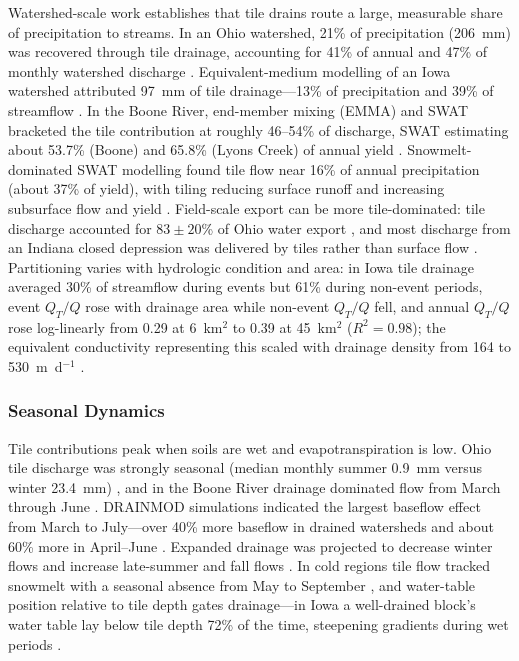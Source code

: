Watershed-scale work establishes that tile drains route a large, measurable share of precipitation to streams. In an Ohio watershed, 21\% of precipitation (206~mm) was recovered through tile drainage, accounting for 41\% of annual and 47\% of monthly watershed discharge \parencite{King2014}. Equivalent-medium modelling of an Iowa watershed attributed 97~mm of tile drainage---13\% of precipitation and 39\% of streamflow \parencite{Thomas2016}. In the Boone River, end-member mixing (EMMA) and SWAT bracketed the tile contribution at roughly 46--54\% of discharge, SWAT estimating about 53.7\% (Boone) and 65.8\% (Lyons Creek) of annual yield \parencite{Schilling2019}. Snowmelt-dominated SWAT modelling found tile flow near 16\% of annual precipitation (about 37\% of yield), with tiling reducing surface runoff and increasing subsurface flow and yield \parencite{Rahman2014}. Field-scale export can be more tile-dominated: tile discharge accounted for $83\pm20$\% of Ohio water export \parencite{Williams2018}, and most discharge from an Indiana closed depression was delivered by tiles rather than surface flow \parencite{Williams2019}. Partitioning varies with hydrologic condition and area: in Iowa tile drainage averaged 30\% of streamflow during events but 61\% during non-event periods, event $Q_T/Q$ rose with drainage area while non-event $Q_T/Q$ fell, and annual $Q_T/Q$ rose log-linearly from 0.29 at 6~km$^2$ to 0.39 at 45~km$^2$ ($R^2=0.98$); the equivalent conductivity representing this scaled with drainage density from 164 to 530~m~d$^{-1}$ \parencite{Thomas2016,King2014}.

\subsubsection{Seasonal Dynamics}

Tile contributions peak when soils are wet and evapotranspiration is low. Ohio tile discharge was strongly seasonal (median monthly summer 0.9~mm versus winter 23.4~mm) \parencite{King2014}, and in the Boone River drainage dominated flow from March through June \parencite{Schilling2019}. \textsc{DRAINMOD} simulations indicated the largest baseflow effect from March to July---over 40\% more baseflow in drained watersheds and about 60\% more in April--June \parencite{Schilling2008}. Expanded drainage was projected to decrease winter flows and increase late-summer and fall flows \parencite{Rahman2014}. In cold regions tile flow tracked snowmelt with a seasonal absence from May to September \parencite{Kompanizare2024}, and water-table position relative to tile depth gates drainage---in Iowa a well-drained block's water table lay below tile depth 72\% of the time, steepening gradients during wet periods \parencite{Logsdon2020}.


